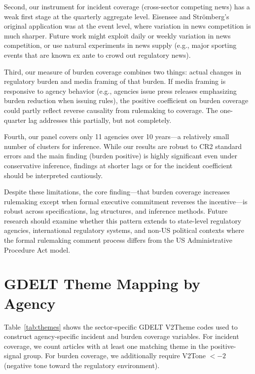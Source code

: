 \documentclass[12pt]{article}
\begin{document}
Second, our instrument for incident coverage (cross-sector competing news) has a weak first stage at the quarterly aggregate level. Eisensee and Str{\"o}mberg's original application was at the event level, where variation in news competition is much sharper. Future work might exploit daily or weekly variation in news competition, or use natural experiments in news supply (e.g., major sporting events that are known ex ante to crowd out regulatory news).

Third, our measure of burden coverage combines two things: actual changes in regulatory burden and media framing of that burden. If media framing is responsive to agency behavior (e.g., agencies issue press releases emphasizing burden reduction when issuing rules), the positive coefficient on burden coverage could partly reflect reverse causality from rulemaking to coverage. The one-quarter lag addresses this partially, but not completely.

Fourth, our panel covers only 11 agencies over 10 years---a relatively small number of clusters for inference. While our results are robust to CR2 standard errors and the main finding (burden positive) is highly significant even under conservative inference, findings at shorter lags or for the incident coefficient should be interpreted cautiously.

Despite these limitations, the core finding---that burden coverage increases rulemaking except when formal executive commitment reverses the incentive---is robust across specifications, lag structures, and inference methods. Future research should examine whether this pattern extends to state-level regulatory agencies, international regulatory systems, and non-US political contexts where the formal rulemaking comment process differs from the US Administrative Procedure Act model.

\label{apep_main_text_end}



\appendix

\section{GDELT Theme Mapping by Agency}
\label{app:gdelt}

Table~\ref{tab:themes} shows the sector-specific GDELT V2Theme codes used to construct agency-specific incident and burden coverage variables. For incident coverage, we count articles with at least one matching theme in the positive-signal group. For burden coverage, we additionally require V2Tone $< -2$ (negative tone toward the regulatory environment).
\end{document}
